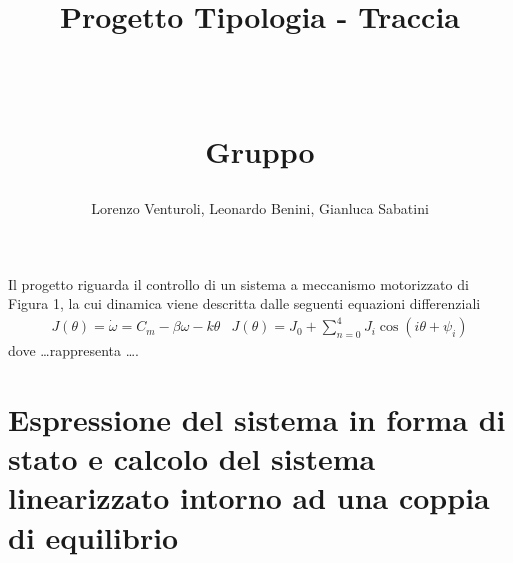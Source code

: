 \documentclass[a4paper, 11pt]{article}
\title{ \vspace{-1in}
		\huge \strut \coursename \strut 
		\\
		\Large  \strut Progetto Tipologia \tipology - Traccia \trace 
		\\
		\Large  \strut \projectname\strut
		\\
		\Large  \strut Gruppo \group\strut
		\vspace{-0.4cm}
}
\author{Lorenzo Venturoli, Leonardo Benini, Gianluca Sabatini}
\date{}
\begin{document}
\maketitle
\vspace{-0.5cm}

Il progetto riguarda il controllo di un sistema a meccanismo motorizzato di Figura 1, la cui dinamica viene descritta dalle seguenti equazioni differenziali  
%
\begin{subequations}\label{eq:system}
\begin{align}
	J(\theta) = \dot{\omega} = C_m - \beta\omega - k\theta 
\end{align}
\begin{align}
	J(\theta) = J_0 + \sum_{n = 0}^{4}J_i\cos (i\theta +\psi_i)
\end{align}
\end{subequations}
%
dove \dots rappresenta \dots.


\section{Espressione del sistema in forma di stato e calcolo del sistema linearizzato intorno ad una coppia di equilibrio}
\end{document}
